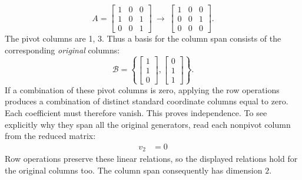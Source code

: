 \[A=\left[\begin{array}{rrr}1&0&0\\1&0&1\\0&0&1\end{array}\right]\ \longrightarrow\ \left[\begin{array}{rrr}1&0&0\\0&0&1\\0&0&0\end{array}\right].\]
The pivot columns are 1, 3. Thus a basis for the column span consists of the corresponding \emph{original} columns:
\[\mathcal B=\left\{\left[\begin{array}{r}1\\1\\0\end{array}\right],\left[\begin{array}{r}0\\1\\1\end{array}\right]\right\}.\]
If a combination of these pivot columns is zero, applying the row operations produces a combination of distinct standard coordinate columns equal to zero. Each coefficient must therefore vanish. This proves independence. To see explicitly why they span all the original generators, read each nonpivot column from the reduced matrix:
\[\begin{aligned}v_{2}&=0\end{aligned}\]
Row operations preserve these linear relations, so the displayed relations hold for the original columns too. The column span consequently has dimension $2$.


